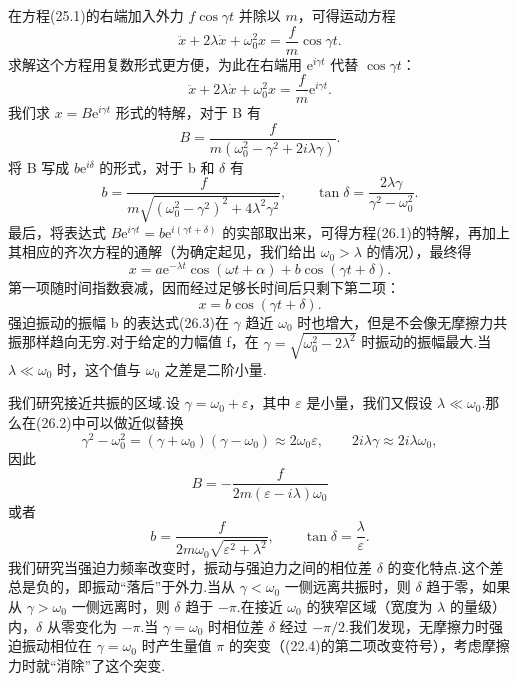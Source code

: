 在方程(25.1)的右端加入外力 $f\cos\gamma t$ 并除以 $m$，可得运动方程
\begin{equation}
  \ddot{x}+2\lambda\dot{x}+\omega_0^2x=\frac{f}{m}\cos\gamma t.
\end{equation}
求解这个方程用复数形式更方便，为此在右端用 $\mathrm{e}^{i\gamma t}$ 代替 $\cos\gamma t$：
\begin{equation*}
  \ddot{x}+2\lambda\dot{x}+\omega_0^2x=\frac{f}{m}\mathrm{e}^{i\gamma t}.
\end{equation*}
我们求 $x=B\mathrm{e}^{i\gamma t}$ 形式的特解，对于 B 有
\begin{equation}
  B=\frac{f}{m\left(\omega_0^2-\gamma^2+2i\lambda\gamma\right)}.
\end{equation}
将 B 写成 $b\mathrm{e}^{i\delta}$ 的形式，对于 b 和 $\delta$ 有
\begin{equation}
  b=\frac{f}{m\sqrt{\left(\omega_0^2-\gamma^2\right)^2+4\lambda^2\gamma^2}},\qquad
  \tan\delta=\frac{2\lambda\gamma}{\gamma^2-\omega_0^2}.
\end{equation}
最后，将表达式 $B\mathrm{e}^{i\gamma t}=b\mathrm{e}^{i(\gamma t+\delta)}$ 的实部取出来，可得方程(26.1)的特解，再加上其相应的齐次方程的通解（为确定起见，我们给出 $\omega_0>\lambda$ 的情况），最终得
\begin{equation}
  x=a\mathrm{e}^{-\lambda t}\cos(\omega t+\alpha)+b\cos(\gamma t+\delta).
\end{equation}
第一项随时间指数衰减，因而经过足够长时间后只剩下第二项：
\begin{equation}
  x=b\cos(\gamma t+\delta).
\end{equation}
强迫振动的振幅 b 的表达式(26.3)在 $\gamma$ 趋近 $\omega_0$ 时也增大，但是不会像无摩擦力共振那样趋向无穷.对于给定的力幅值 f，在 $\gamma=\sqrt{\omega_0^2-2\lambda^2}$ 时振动的振幅最大.当 $\lambda\ll\omega_0$ 时，这个值与 $\omega_0$ 之差是二阶小量.

我们研究接近共振的区域.设 $\gamma=\omega_0+\varepsilon$，其中 $\varepsilon$ 是小量，我们又假设 $\lambda\ll\omega_0$.那么在(26.2)中可以做近似替换
\begin{equation*}
  \gamma^2-\omega_0^2=\left(\gamma+\omega_0\right)\left(\gamma-\omega_0\right)\approx2\omega_0\varepsilon,\qquad
  2i\lambda\gamma\approx2i\lambda\omega_0,
\end{equation*}
因此
\begin{equation}
  B=-\frac{f}{2m\left(\varepsilon-i\lambda\right)\omega_0}
\end{equation}
或者
\begin{equation}
  b=\frac{f}{2m\omega_0\sqrt{\varepsilon^2+\lambda^2}},\qquad
  \tan\delta=\frac{\lambda}{\varepsilon}.
\end{equation}
我们研究当强迫力频率改变时，振动与强迫力之间的相位差 $\delta$ 的变化特点.这个差总是负的，即振动“落后”于外力.当从 $\gamma<\omega_0$ 一侧远离共振时，则 $\delta$ 趋于零，如果从 $\gamma>\omega_0$ 一侧远离时，则 $\delta$ 趋于 $-\pi$.在接近 $\omega_0$ 的狭窄区域（宽度为 $\lambda$ 的量级）内，$\delta$ 从零变化为 $-\pi$.当 $\gamma=\omega_0$ 时相位差 $\delta$ 经过 $-\pi/2$.我们发现，无摩擦力时强迫振动相位在 $\gamma=\omega_0$ 时产生量值 $\pi$ 的突变（(22.4)的第二项改变符号），考虑摩擦力时就“消除”了这个突变.

